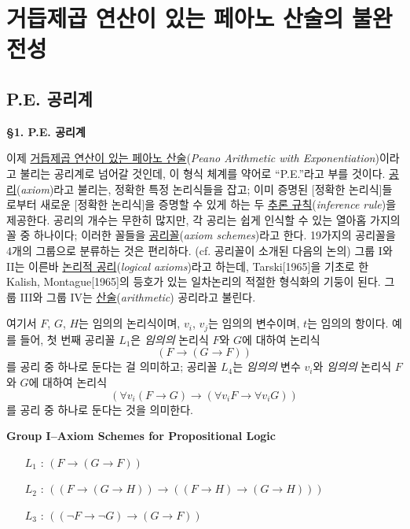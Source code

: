 \documentclass[12pt]{paper}
\begin{document}
\newpage

\section{거듭제곱 연산이 있는 페아노 산술의 불완전성}
\hspace{12pt}

\subsection{P.E. 공리계}
\hspace{12pt}

\noindent \textbf{\S1. P.E. 공리계}

이제 \underline{거듭제곱 연산이 있는 페아노 산술}(\textit{Peano Arithmetic with Exponentiation})이라고 불리는 공리계로 넘어갈 것인데,
이 형식 체계를 약어로 ``P.E.''라고 부를 것이다.
\underline{공리}(\textit{axiom})라고 불리는, 정확한 특정 논리식들을 잡고;
이미 증명된 [정확한 논리식]들로부터 새로운 [정확한 논리식]을 증명할 수 있게 하는 두 \underline{추론 규칙}(\textit{inference rule})을 제공한다.
공리의 개수는 무한히 많지만,
각 공리는 쉽게 인식할 수 있는 열아홉 가지의 꼴 중 하나이다;
이러한 꼴들을 \underline{공리꼴}(\textit{axiom schemes})라고 한다.
19가지의 공리꼴을 4개의 그룹으로 분류하는 것은 편리하다. (cf. 공리꼴이 소개된 다음의 논의)
그룹 I와 II는 이른바 \underline{논리적 공리}(\textit{logical axioms})라고 하는데,
Tarski[1965]을 기초로 한 Kalish, Montague[1965]의 등호가 있는 일차논리의 적절한 형식화의 기둥이 된다.
그룹 III와 그룹 IV는 \underline{산술}(\textit{arithmetic}) 공리라고 불린다.

여기서
$F$, $G$, $H$는 임의의 논리식이며,
$v_i$, $v_j$는 임의의 변수이며,
$t$는 임의의 항이다.
예를 들어, 첫 번째 공리꼴 $L_1$은 \textit{임의의} 논리식 $F$와 $G$에 대하여 논리식 $$\left( F \rightarrow \left( G \rightarrow F \right) \right)$$를 공리 중 하나로 둔다는 걸 의미하고;
공리꼴 $L_4$는 \textit{임의의} 변수 $v_i$와 \textit{임의의} 논리식 $F$와 $G$에 대하여 논리식 $$\left( \forall v_i \left( F \rightarrow G \right) \rightarrow \left( \forall v_i F \rightarrow \forall v_i G \right) \right)$$를 공리 중 하나로 둔다는 것을 의미한다.

\noindent \textbf{Group I--Axiom Schemes for Propositional Logic}
\begin{enumerate}
\item[$L_{1}$ :] $\left( F \rightarrow \left( G \rightarrow F \right) \right)$
\item[$L_{2}$ :] $\left( \left( F \rightarrow \left( G \rightarrow H \right) \right) \rightarrow \left( \left( F \rightarrow H \right) \rightarrow \left( G \rightarrow H \right) \right) \right)$
\item[$L_{3}$ :] $\left( \left( \lnot F \rightarrow \lnot G \right) \rightarrow \left( G \rightarrow F \right) \right)$
\end{enumerate}
\end{document}
